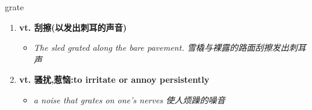 
\begin{frame}
{\huge grate}
\begin{center}
\begin{enumerate}\Large
  \item \textbf{vt. 刮擦(以发出刺耳的声音)}
  \begin{itemize}
    \item \em{\Large{The sled grated along the bare pavement. 雪橇与裸露的路面刮擦发出刺耳声}}
  \end{itemize}
  \item \textbf{vt. 骚扰,惹恼:to irritate or annoy persistently}
  \begin{itemize}
    \item \em{\Large{a noise that grates on one's nerves 使人烦躁的噪音}}
  \end{itemize}
\end{enumerate}
\end{center}
\end{frame}
